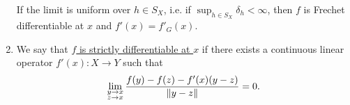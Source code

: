 \begin{definition}
\begin{enumerate}
    If the limit is uniform over $h \in S_X$, i.e. if $\sup_{h \in S_X} \delta_h < \infty$, then $f$ is Frechet differentiable at $x$ and $f'(x) = f'_G(x)$.

    \item We say that \uline{$f$ is strictly differentiable at $x$} if there exists a continuous linear operator $f'(x): X \to Y$ such that
    \begin{align*}
      \lim_{\substack{y \to x \\ z \to x}} \frac{f(y) - f(z) - f'(x)(y - z)} {\left\Vert y - z \right\Vert} = 0.
    \end{align*}

  \end{enumerate}
\end{definition}
